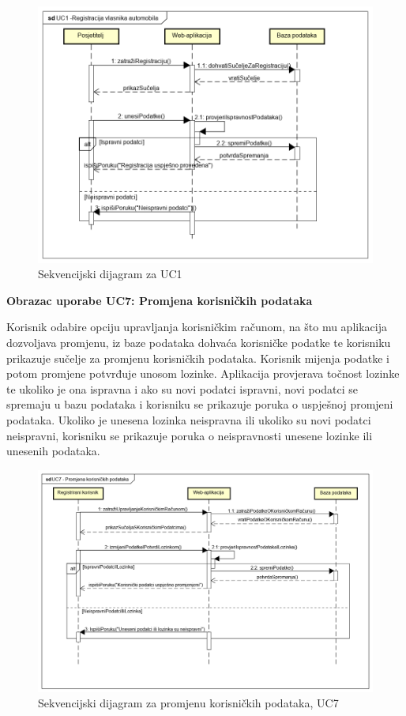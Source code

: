 \begin{figure}[H]
	\includegraphics[width=\linewidth]{dijagrami/seq-dia-UC1.png}
	\centering
	\caption{Sekvencijski dijagram za UC1}
	\label{fig:sequence-diagram1}
\end{figure}

\textbf{Obrazac uporabe UC7: Promjena korisničkih podataka}

\noindent Korisnik odabire opciju upravljanja korisničkim računom, na što mu aplikacija dozvoljava promjenu, iz baze podataka dohvaća korisničke podatke te korisniku prikazuje sučelje za promjenu korisničkih podataka. Korisnik mijenja podatke i potom promjene potvrđuje unosom lozinke. Aplikacija provjerava točnost lozinke te ukoliko je ona ispravna i ako su novi podatci ispravni, novi podatci se spremaju u bazu podataka i korisniku se prikazuje poruka o uspješnoj promjeni podataka. Ukoliko je unesena lozinka neispravna ili ukoliko su novi podatci neispravni, korisniku se prikazuje poruka o neispravnosti unesene lozinke ili unesenih podataka.

\begin{figure}[H]
	\includegraphics[width=\linewidth]{dijagrami/seq-dia-UC7.png}
	\centering
	\caption{Sekvencijski dijagram za promjenu korisničkih podataka, UC7}
	\label{fig:sequence-diagram1}
\end{figure}

